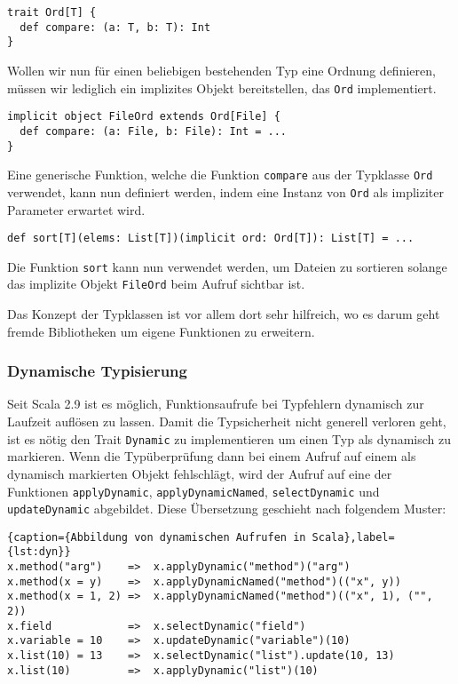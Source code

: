 \begin{lstlisting}
trait Ord[T] {
  def compare: (a: T, b: T): Int
}
\end{lstlisting}

Wollen wir nun für einen beliebigen bestehenden Typ eine Ordnung definieren, müssen wir lediglich
ein implizites Objekt bereitstellen, das \texttt{Ord} implementiert.

\begin{lstlisting}
implicit object FileOrd extends Ord[File] {
  def compare: (a: File, b: File): Int = ...
}
\end{lstlisting}

Eine generische Funktion, welche die Funktion \texttt{compare} aus der Typklasse \texttt{Ord}
verwendet, kann nun definiert werden, indem eine Instanz von \texttt{Ord} als impliziter Parameter
erwartet wird.

\begin{lstlisting}
def sort[T](elems: List[T])(implicit ord: Ord[T]): List[T] = ...
\end{lstlisting}

Die Funktion \texttt{sort} kann nun verwendet werden, um Dateien zu sortieren solange das implizite
Objekt \texttt{FileOrd} beim Aufruf sichtbar ist.

Das Konzept der Typklassen ist vor allem dort sehr hilfreich, wo es darum geht fremde  Bibliotheken um
eigene Funktionen zu erweitern.

\subsubsection{Dynamische Typisierung}
\label{sec:dyn}

Seit Scala 2.9 ist es möglich, Funktionsaufrufe bei Typfehlern dynamisch zur  Laufzeit auflösen zu
lassen. Damit die Typsicherheit nicht generell verloren  geht, ist es nötig den Trait
\texttt{Dynamic} zu implementieren um einen Typ als dynamisch zu markieren. Wenn die Typüberprüfung
dann bei einem Aufruf auf einem als dynamisch markierten Objekt fehlschlägt, wird der Aufruf auf
eine der Funktionen \texttt{applyDynamic}, \texttt{applyDynamicNamed}, \texttt{selectDynamic} und
\texttt{updateDynamic}  abgebildet. Diese Übersetzung geschieht nach folgendem Muster:

\begin{lstlisting}{caption={Abbildung von dynamischen Aufrufen in Scala},label={lst:dyn}}
x.method("arg")    =>  x.applyDynamic("method")("arg")
x.method(x = y)    =>  x.applyDynamicNamed("method")(("x", y))
x.method(x = 1, 2) =>  x.applyDynamicNamed("method")(("x", 1), ("", 2))
x.field            =>  x.selectDynamic("field")
x.variable = 10    =>  x.updateDynamic("variable")(10)
x.list(10) = 13    =>  x.selectDynamic("list").update(10, 13)
x.list(10)         =>  x.applyDynamic("list")(10)
\end{lstlisting}
 

